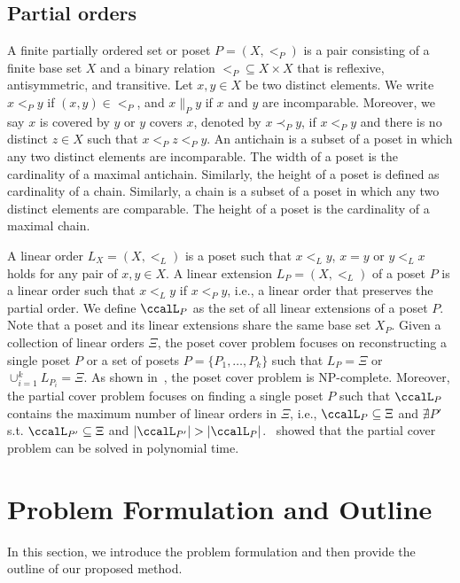 \documentclass[Afour,sageh,times]{sagej}
\begin{document}
\subsection{Partial orders}\label{sec:partial}
A finite partially ordered set or poset $P = (X, <_P )$  is a pair consisting of a finite base set $X$ and a binary relation $<_P \subseteq X \times X$ that is reflexive, antisymmetric, and transitive. Let  $x, y \in X$ be two distinct elements. We write $x <_P y$ if $(x,y) \in <_P$, and $x \|_P y$ if  $x$ and $y$ are incomparable. Moreover, we say $x$ is covered by $y$ or $y$ covers $x$, denoted by $x \prec_P y$, if $x<_P  y$ and there is no distinct $z \in X$ such that $x  <_P  z <_P y$. An antichain is a subset of a poset  in which any two distinct elements   are incomparable. The width of a poset is the cardinality of a maximal antichain. Similarly, the height of a poset is defined as  cardinality of a chain. Similarly, a chain is a subset of a poset  in which any two distinct elements are comparable. The height of a poset is the cardinality of a maximal chain.

A linear order $L_X=(X, <_L)$ is a poset such that $x <_L y$, $x = y$ or $y <_L x$ holds for any pair of  $x, y \in X$. A linear extension  $L_P = (X, <_L)$  of a poset $P$ is a linear order such that $x <_L y$ if $x <_P y$, i.e., a linear order that preserves the partial order.
We define $\ccalL_P$ as the set of all linear extensions of a poset $P$. Note that a poset and its linear extensions share the same base set $X_P$. Given a collection of linear orders $\Xi$, the poset cover problem focuses on reconstructing a single poset $P$ or a set of posets $P = \{P_1,\ldots,P_k\}$ such that $L_P = \Xi$ or $\cup_{i=1}^k L_{P_i} = \Xi$. As shown in~\cite{heath2013poset}, the poset cover problem is NP-complete. Moreover, the partial cover problem focuses on finding a single poset $P$ such that $\ccalL_P$ contains the maximum number of linear orders in $\Xi$, i.e., $\ccalL_P \subseteq \Xi$ and   $\nexists P'$ s.t. $\ccalL_{P'} \subseteq \Xi$ and $|\ccalL_{P'}| > |\ccalL_{P}|$.~\cite{heath2013poset} showed that the partial cover problem can be solved in polynomial time.



\section{Problem Formulation and Outline}\label{sec:problem}
In this section, we introduce the problem formulation and then provide the outline of our proposed method.
\end{document}
